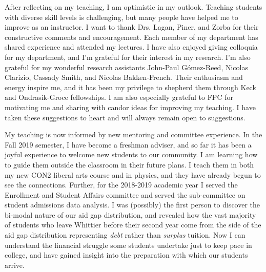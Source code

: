 \documentclass[../../main.tex]{subfiles}
\begin{document}
\label{sec:out}

After reflecting on my teaching, I am optimistic in my outlook.  Teaching students with diverse skill levels is challenging, but many people have helped me to improve as an instructor.  I want to thank Drs. Lagan, Piner, and Zorba for their constructive comments and encouragement.  Each member of my department has shared experience and attended my lectures.  I have also enjoyed giving colloquia for my department, and I'm grateful for their interest in my research.  I'm also grateful for my wonderful research assistants John-Paul G\'omez-Reed, Nicolas Clarizio, Cassady Smith, and Nicolas Bakken-French.  Their enthusiasm and energy inspire me, and it has been my privilege to shepherd them through Keck and Ondrasik-Groce fellowships. I am also especially grateful to FPC for motivating me and sharing with candor ideas for improving my teaching.  I have taken these suggestions to heart and will always remain open to suggestions.  \\ \hspace{0.1cm}

My teaching is now informed by new mentoring and committee experience.  In the Fall 2019 semester, I have become a freshman adviser, and so far it has been a joyful experience to welcome new students to our community.  I am learning how to guide them outside the classroom in their future plans.  I teach them in both my new CON2 liberal arts course and in physics, and they have already begun to see the connections.  Further, for the 2018-2019 academic year I served the Enrollment and Student Affairs committee and served the sub-committee on student admissions data analysis.  I was (possibly) the first person to discover the bi-modal nature of our aid gap distribution, and revealed how the vast majority of students who leave Whittier before their second year come from the side of the aid gap distribution representing \textit{debt} rather than \textit{surplus} tuition.  Now I can understand the financial struggle some students undertake just to keep pace in college, and have gained insight into the preparation with which our students arrive.  \\ \hspace{0.1cm}
\end{document}
